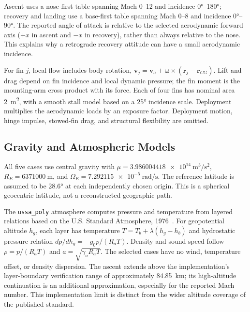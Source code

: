 \documentclass[11pt,letterpaper]{article}
\newcommand{\code}[1]{\texttt{#1}}
\begin{document}
Ascent uses a nose-first table spanning Mach 0--12 and incidence \ang{0}--\ang{180}; recovery and landing use a base-first table spanning Mach 0--8 and incidence \ang{0}--\ang{90}. The reported angle of attack is relative to the selected aerodynamic forward axis ($+x$ in ascent and $-x$ in recovery), rather than always relative to the nose. This explains why a retrograde recovery attitude can have a small aerodynamic incidence.

For fin $j$, local flow includes body rotation, $\bm v_j=\bm v_a+\bm\omega\times(\bm r_j-\bm r_{CG})$. Lift and drag depend on fin incidence and local dynamic pressure; the fin moment is the mounting-arm cross product with its force. Each of four fins has nominal area \SI{2}{\square\metre}, with a smooth stall model based on a \ang{25} incidence scale. Deployment multiplies the aerodynamic loads by an exposure factor. Deployment motion, hinge impulse, stowed-fin drag, and structural flexibility are omitted.

\subsection{Gravity and Atmospheric Models}
All five cases use central gravity with $\mu=\SI{3.986004418e14}{\metre\cubed\per\second\squared}$, $R_E=\SI{6371000}{\metre}$, and $\Omega_E=\SI{7.292115e-5}{\radian\per\second}$. The reference latitude is assumed to be \ang{28.6} at each independently chosen origin. This is a spherical geocentric latitude, not a reconstructed geographic path.

The \code{ussa\_poly} atmosphere computes pressure and temperature from layered relations based on the U.S. Standard Atmosphere, 1976~\cite{ussa}. For geopotential altitude $h_g$, each layer has temperature $T=T_b+\lambda(h_g-h_b)$ and hydrostatic pressure relation $dp/dh_g=-g_0p/(R_aT)$. Density and sound speed follow $\rho=p/(R_aT)$ and $a=\sqrt{\gamma_aR_aT}$. The selected cases have no wind, temperature offset, or density dispersion. The ascent extends above the implementation's layer-boundary verification range of approximately \SI{84.85}{\kilo\metre}; its high-altitude continuation is an additional approximation, especially for the reported Mach number. This implementation limit is distinct from the wider altitude coverage of the published standard.
\end{document}
